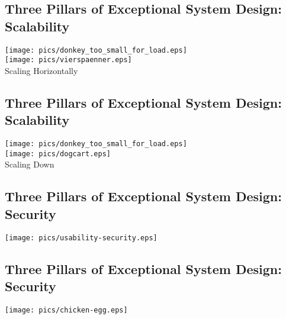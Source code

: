 \documentclass[xga]{xdvislides}
\begin{document}
\subsection{Three Pillars of Exceptional System Design: Scalability}
\vspace*{\fill}
\begin{center}
    \texttt{[image: pics/donkey\_too\_small\_for\_load.eps]} \\
    \texttt{[image: pics/vierspaenner.eps]} \\
	Scaling Horizontally
\end{center}
\vspace*{\fill}

\subsection{Three Pillars of Exceptional System Design: Scalability}
\vspace*{\fill}
\begin{center}
    \texttt{[image: pics/donkey\_too\_small\_for\_load.eps]} \\
    \texttt{[image: pics/dogcart.eps]} \\
	Scaling Down
\end{center}
\vspace*{\fill}

\subsection{Three Pillars of Exceptional System Design: Security}
\vspace*{\fill}
\begin{center}
    \texttt{[image: pics/usability-security.eps]} \\
\end{center}
\vspace*{\fill}

\subsection{Three Pillars of Exceptional System Design: Security}
\vspace*{\fill}
\begin{center}
    \texttt{[image: pics/chicken-egg.eps]} \\
\end{center}
\vspace*{\fill}
\end{document}
